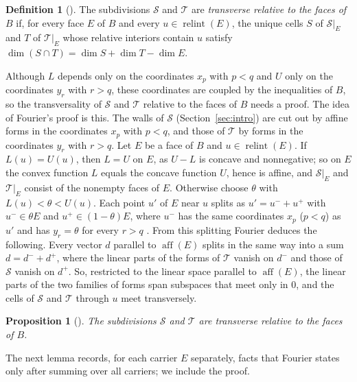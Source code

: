 \documentclass[11pt]{article}
\newtheorem{proposition}[theorem]{Proposition}
\theoremstyle{definition}
\newtheorem{definition}[theorem]{Definition}
\theoremstyle{remark}
\newcommand{\SSS}{\mathcal S}
\newcommand{\TT}{\mathcal T}
\newcommand{\relint}{\operatorname{relint}}
\newcommand{\aff}{\operatorname{aff}}
\begin{document}
\begin{definition}[{\cite[Definition~4.2]{Fourier}}]\label{def:transverse}
The subdivisions $\SSS$ and $\TT$ are \emph{transverse relative to the faces of $B$} if,
for every face $E$ of $B$ and every $u\in\relint(E)$, the unique cells
$S$ of $\SSS|_E$ and $T$ of $\TT|_E$ whose relative interiors contain
$u$ satisfy $\dim(S\cap T)=\dim S+\dim T-\dim E$.
\end{definition}

Although $L$ depends only on the coordinates $x_p$ with $p<q$ and $U$ only
on the coordinates $y_r$ with $r>q$, these coordinates are coupled by the inequalities of $B$,
so the transversality of $\SSS$ and $\TT$ relative to the faces of $B$ needs a proof. The idea of Fourier's proof is this. The walls of $\SSS$ (Section~\ref{sec:intro}) are cut out by affine forms in the coordinates $x_p$ with $p<q$, and those of $\TT$ by forms in the coordinates $y_r$ with $r>q$. Let $E$ be a face of $B$ and $u\in\relint(E)$. If $L(u)=U(u)$, then $L=U$ on $E$, as $U-L$ is concave and nonnegative; so on $E$ the convex function $L$ equals the concave function $U$, hence is affine, and $\SSS|_E$ and $\TT|_E$ consist of the nonempty faces of $E$. Otherwise choose $\theta$ with $L(u)<\theta<U(u)$. Each point $u'$ of $E$ near $u$ splits as $u'=u^-+u^+$ with $u^-\in\theta E$ and $u^+\in(1-\theta)E$, where $u^-$ has the same coordinates $x_p$ ($p<q$) as $u'$ and has $y_r=\theta$ for every $r>q$ \cite[Lemma~5.1 and Step~1 of the proof of Proposition~5.2]{Fourier}. From this splitting Fourier deduces the following. Every vector $d$ parallel to $\aff(E)$ splits in the same way into a sum $d=d^-+d^+$, where the linear parts of the forms of $\TT$ vanish on $d^-$ and those of $\SSS$ vanish on $d^+$. So, restricted to the linear space parallel to $\aff(E)$, the linear parts of the two families of forms span subspaces that meet only in $0$, and the cells of $\SSS$ and $\TT$ through $u$ meet transversely.

\begin{proposition}[{\cite[Proposition~5.2]{Fourier}}]\label{prop:transverse}
The subdivisions $\SSS$ and $\TT$ are transverse relative to the faces of $B$.
\end{proposition}

The next lemma records, for each carrier $E$ separately, facts that Fourier \cite[Lemma~4.3]{Fourier} states only after summing over all carriers;
we include the proof.
\end{document}
